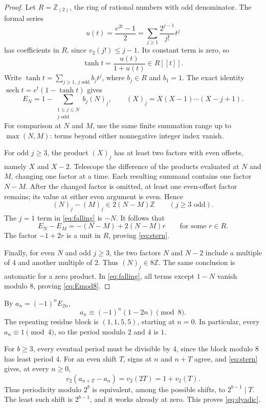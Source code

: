 \documentclass[11pt,a4paper]{article}
\numberwithin{equation}{section}
\theoremstyle{definition}
\newcommand{\Z}{\mathbb Z}
\DeclareMathOperator{\sech}{sech}
\begin{document}
\begin{proof}
Let $R=\Z_{(2)}$, the ring of rational numbers with odd denominator.
The formal series
\[
u(t)=\frac{e^{2t}-1}{2}
=\sum_{j\ge1}\frac{2^{j-1}}{j!}t^j
\]
has coefficients in $R$, since $v_2(j!)\le j-1$. Its constant term is
zero, so
\[
\tanh t=\frac{u(t)}{1+u(t)}\in R[[t]].
\]
Write $\tanh t=\sum_{j\ge1,\ j\text{ odd}}b_jt^j$, where $b_j\in R$
and $b_1=1$.
The exact identity $\sech t=e^t(1-\tanh t)$ gives
\begin{equation}\label{eq:falling}
E_N=1-\sum_{\substack{1\le j\le N\\j\text{ odd}}}
b_j(N)_{\underline j},
\qquad (X)_{\underline j}=X(X-1)\cdots(X-j+1).
\end{equation}
For comparison at $N$ and $M$, use the same finite summation range up to
$\max(N,M)$: terms beyond either nonnegative integer index vanish.

For odd $j\ge3$, the product $(X)_{\underline j}$ has at least two
factors with even offsets, namely $X$ and $X-2$. Telescope the difference
of the products evaluated at $N$ and $M$, changing one factor at a time.
Each resulting summand contains one factor $N-M$. After the changed
factor is omitted, at least one even-offset factor remains; its value at
either even argument is even. Hence
\[
(N)_{\underline j}-(M)_{\underline j}\in2(N-M)\Z
\qquad(j\ge3\text{ odd}).
\]
The $j=1$ term in \eqref{eq:falling} is $-N$. It follows that
\[
E_N-E_M=-(N-M)+2(N-M)r\qquad\text{for some }r\in R.
\]
The factor $-1+2r$ is a unit in $R$, proving \eqref{eq:stern}.

Finally, for even $N$ and odd $j\ge3$, the two factors $N$ and $N-2$
include a multiple of $4$ and another multiple of $2$. Thus
$(N)_{\underline j}\in8\Z$. The same conclusion is automatic for a
zero product. In \eqref{eq:falling}, all terms except $1-N$ vanish
modulo $8$, proving \eqref{eq:Emod8}.
\end{proof}

By $a_n=(-1)^nE_{2n}$,
\begin{equation}\label{eq:amod8}
a_n\equiv(-1)^n(1-2n)\pmod8.
\end{equation}
The repeating residue block is $(1,1,5,5)$, starting at $n=0$.
In particular, every $a_n\equiv1\pmod4$, so the period modulo $2$ and
$4$ is $1$.

For $b\ge3$, every eventual period must be divisible by $4$, since the
block modulo $8$ has least period $4$. For an even shift $T$, signs at
$n$ and $n+T$ agree, and \eqref{eq:stern} gives, at every $n\ge0$,
\[
v_2(a_{n+T}-a_n)=v_2(2T)=1+v_2(T).
\]
Thus periodicity modulo $2^b$ is equivalent, among the possible shifts,
to $2^{b-1}\mid T$. The least such shift is $2^{b-1}$, and it works
already at zero. This proves \eqref{eq:dyadic}.
\end{document}
